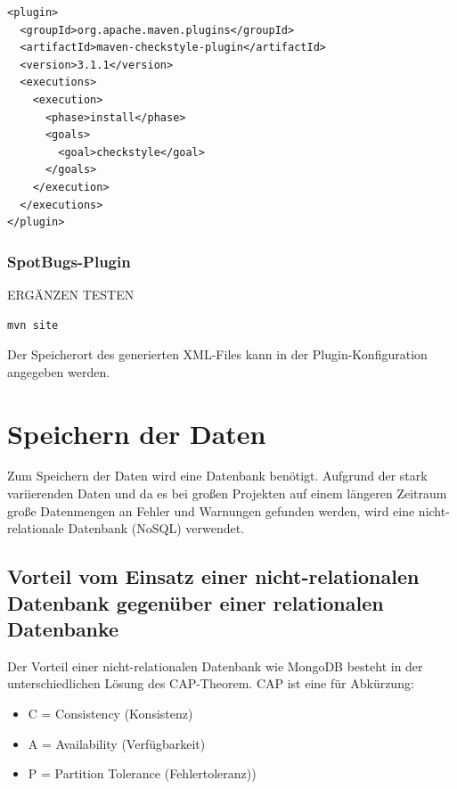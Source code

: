 \begin{samepage}%
	\begin{lstlisting}[float=tbhp]
<plugin>
  <groupId>org.apache.maven.plugins</groupId>
  <artifactId>maven-checkstyle-plugin</artifactId>
  <version>3.1.1</version>
  <executions>
    <execution>
      <phase>install</phase>
      <goals>
        <goal>checkstyle</goal>
      </goals>
    </execution>
  </executions>
</plugin>
	\end{lstlisting}
\end{samepage}
\subsubsection{SpotBugs-Plugin}
ERGÄNZEN TESTEN
\begin{verbatim}
mvn site
\end{verbatim}
Der Speicherort des generierten XML-Files kann in der Plugin-Konfiguration angegeben werden.


\section{Speichern der Daten} 

Zum Speichern der Daten wird eine Datenbank benötigt. Aufgrund der stark variierenden Daten und da es bei großen Projekten auf einem längeren Zeitraum große Datenmengen an Fehler und Warnungen gefunden werden, wird eine nicht-relationale Datenbank (NoSQL) verwendet. 

\subsection{Vorteil vom Einsatz einer nicht-relationalen Datenbank gegenüber einer relationalen Datenbanke }
Der Vorteil einer nicht-relationalen Datenbank wie MongoDB besteht in der unterschiedlichen Lösung des CAP-Theorem. CAP ist eine für Abkürzung:

\begin{itemize}
\item C = Consistency (Konsistenz)
\item A = Availability (Verfügbarkeit) 
\item P = Partition Tolerance (Fehlertoleranz))
\end{itemize}


